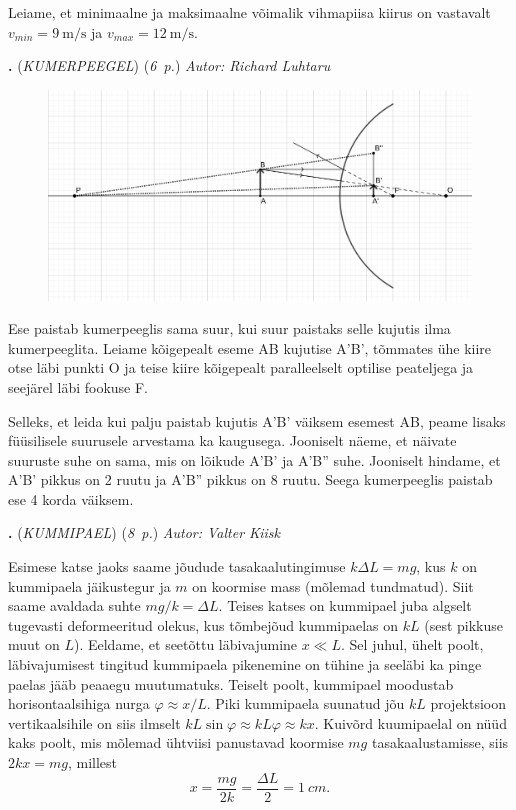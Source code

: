 \documentclass[11pt,a5paper]{article}
\newcommand{\numb}[1]{\vspace{5pt}\textbf{\large #1}}
\newcommand{\nimi}[1]{(\textsl{\small #1})}
\newcommand{\punktid}[1]{(\emph{#1~p.})}
\newcounter{ylesanne}
\newcommand{\yl}[1]{\addtocounter{ylesanne}{1}\numb{\theylesanne.} \nimi{#1} \newblock{}}
\newcommand{\autor}[1]{\emph{ Autor: #1}}%
\begin{document}
Leiame, et minimaalne ja maksimaalne võimalik vihmapiisa kiirus on vastavalt $v_{min} = \SI{9}{\meter\per\second}$ ja $v_{max} = \SI{12}{\meter\per\second}$.


\yl{KUMERPEEGEL}
\punktid{6} \autor{Richard Luhtaru}

\begin{figure}[h]
    \centering
    \includegraphics[width=\linewidth]{kumerpeegel-lah-joonis.png}
\end{figure}

Ese paistab kumerpeeglis sama suur, kui suur paistaks selle kujutis ilma kumerpeeglita. Leiame kõigepealt eseme AB kujutise A'B', tõmmates ühe kiire otse läbi punkti O ja teise kiire kõigepealt paralleelselt optilise peateljega ja seejärel läbi fookuse F.

Selleks, et leida kui palju paistab kujutis A'B' väiksem esemest AB, peame lisaks füüsilisele suurusele arvestama ka kaugusega. Jooniselt näeme, et näivate suuruste suhe on sama, mis on lõikude A'B' ja A'B'' suhe. Jooniselt hindame, et A'B' pikkus on 2 ruutu ja A'B'' pikkus on 8 ruutu. Seega kumerpeeglis paistab ese 4 korda väiksem.

\newpage

\yl{KUMMIPAEL}
\punktid{8} \autor{Valter Kiisk}

Esimese katse jaoks saame jõudude tasakaalutingimuse $k\Delta L=mg$, kus $k$ on kummipaela jäikustegur ja $m$ on koormise mass (mõlemad tundmatud). Siit saame avaldada suhte $mg/k=\Delta L$. Teises katses on kummipael juba algselt tugevasti deformeeritud olekus, kus tõmbejõud kummipaelas on $kL$ (sest pikkuse muut on $L$). Eeldame, et seetõttu läbivajumine $x\ll L$. Sel juhul, ühelt poolt, läbivajumisest tingitud kummipaela pikenemine on tühine ja seeläbi ka pinge paelas jääb peaaegu muutumatuks. Teiselt poolt, kummipael moodustab horisontaalsihiga nurga $\varphi\approx x/L$. Piki kummipaela suunatud jõu $kL$ projektsioon vertikaalsihile on siis ilmselt $kL\sin\varphi\approx kL\varphi\approx kx$. Kuivõrd kuumipaelal on nüüd kaks poolt, mis mõlemad ühtviisi panustavad koormise $mg$ tasakaalustamisse, siis $2kx=mg$, millest
\[
x =\frac{mg}{2k} =\frac{\Delta L}{2} = \SI{1}{cm}.
\]
\end{document}
